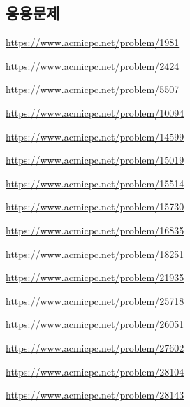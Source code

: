 \subsection{응용문제}
\begin{problem} \url{https://www.acmicpc.net/problem/1981} \end{problem}
\begin{problem} \url{https://www.acmicpc.net/problem/2424} \end{problem}
\begin{problem} \url{https://www.acmicpc.net/problem/5507} \end{problem}
\begin{problem} \url{https://www.acmicpc.net/problem/10094} \end{problem}
\begin{problem} \url{https://www.acmicpc.net/problem/14599} \end{problem}
\begin{problem} \url{https://www.acmicpc.net/problem/15019} \end{problem}
\begin{problem} \url{https://www.acmicpc.net/problem/15514} \end{problem}
\begin{problem} \url{https://www.acmicpc.net/problem/15730} \end{problem}
\begin{problem} \url{https://www.acmicpc.net/problem/16835} \end{problem}
\begin{problem} \url{https://www.acmicpc.net/problem/18251} \end{problem}
\begin{problem} \url{https://www.acmicpc.net/problem/21935} \end{problem}
\begin{problem} \url{https://www.acmicpc.net/problem/25718} \end{problem}
\begin{problem} \url{https://www.acmicpc.net/problem/26051} \end{problem}
\begin{problem} \url{https://www.acmicpc.net/problem/27602} \end{problem}
\begin{problem} \url{https://www.acmicpc.net/problem/28104} \end{problem}
\begin{problem} \url{https://www.acmicpc.net/problem/28143} \end{problem}

